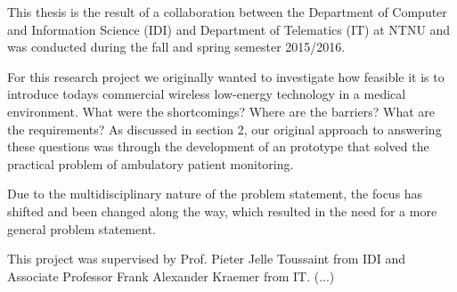 \begin{0_preface}

\noindent  
This thesis is the result of a collaboration between the Department of Computer and Information Science (IDI) and Department of Telematics (IT) at NTNU and was conducted during the fall and spring semester 2015/2016.

For this research project we originally wanted to investigate how feasible it is to introduce todays commercial wireless low-energy technology in a medical environment. What were the shortcomings? Where are the barriers? What are the requirements? As discussed in section 2, our original approach to answering these questions was through the development of an prototype that solved the practical problem of ambulatory patient monitoring.

Due to the multidisciplinary nature of the problem statement, the focus has shifted and been changed along the way, which resulted in the need for a more general problem statement.

This project was supervised by Prof. Pieter Jelle Toussaint from IDI and Associate Professor Frank Alexander Kraemer from IT.
  (...)
  
\end{0_preface}